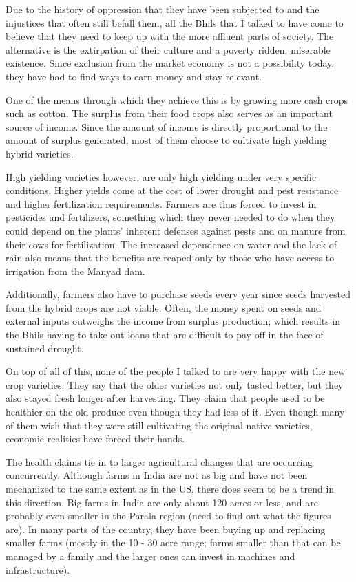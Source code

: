 \documentclass[report.tex]{subfiles}
\begin{document}
Due to the history of oppression that they have been subjected to and the injustices that often still befall them, all the Bhils that I talked to have come to believe that they need to keep up with the more affluent parts of society. The alternative is the extirpation of their culture and a poverty ridden, miserable existence. Since exclusion from the market economy is not a possibility today, they have had to find ways to earn money and stay relevant.

One of the means through which they achieve this is by growing more cash crops such as cotton. The surplus from their food crops also serves as an important source of income. Since the amount of income is directly proportional to the amount of surplus generated, most of them choose to cultivate high yielding hybrid varieties.

High yielding varieties however, are only high yielding under very specific conditions. Higher yields come at the cost of lower drought and pest resistance and higher fertilization requirements. Farmers are thus forced to invest in pesticides and fertilizers, something which they never needed to do when they could depend on the plants' inherent defenses against pests and on manure from their cows for fertilization. The increased dependence on water and the lack of rain also means that the benefits are reaped only by those who have access to irrigation from the Manyad dam.

Additionally, farmers also have to purchase seeds every year since seeds harvested from the hybrid crops are not viable. Often, the money spent on seeds and external inputs outweighs the income from surplus production; which results in the Bhils having to take out loans that are difficult to pay off in the face of sustained drought.

On top of all of this, none of the people I talked to are very happy with the new crop varieties. They say that the older varieties not only tasted better, but they also stayed fresh longer after harvesting. They claim that people used to be healthier on the old produce even though they had less of it. Even though many of them wish that they were still cultivating the original native varieties, economic realities have forced their hands.

The health claims tie in to larger agricultural changes that are occurring concurrently. Although farms in India are not as big and have not been mechanized to the same extent as in the US, there does seem to be a trend in this direction. Big farms in India are only about 120 acres or less, and are probably even smaller in the Parala region (need to find out what the figures are). In many parts of the country, they have been buying up and replacing smaller farms (mostly in the 10 - 30 acre range; farms smaller than that can be managed by a family and the larger ones can invest in machines and infrastructure).
\end{document}
